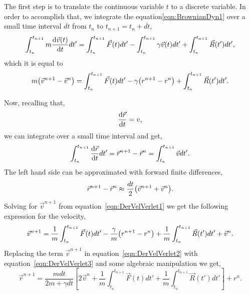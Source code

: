 The first step is to translate the continuous variable $t$ to a discrete variable.
In order to accomplish that, we integrate the equation\eqref{eqn:BrownianDyn1} over a small time interval $dt$ from $t_n$ to $t_{n+1}=t_{n}+dt$,
\begin{align}
    \int_{t_n}^{t_{n+1}}m\dv{\vec{v}(t)}{t}dt'
    =
    \int_{t_n}^{t_{n+1}}\vec{F}(t)dt'
    -\int_{t_n}^{t_{n+1}}\gamma\vec{v}(t)dt'
    +\int_{t_n}^{t_{n+1}}\vec{R}(t')dt',
\end{align}
which it is equal to
\begin{align}
    m\qty(\vec{v}^{n+1} - \vec{v}^{n})
    =
    \int_{t_n}^{t_{n+1}}\vec{F}(t)dt'
    -\gamma\qty(r^{n+1}-r^n)
    +\int_{t_n}^{t_{n+1}}\vec{R}(t')dt'\label{eqn:DerVelVerlet1}.
\end{align}

Now, recalling that,
\begin{gather}
    \dv{\vec{r}}{t} = v,
\end{gather}
we can integrate over a small time interval and get,
\begin{gather}
    \int_{t_n}^{t_{n+1}}\dv{\vec{r}}{t} dt' = \vec{r}^{n+1}-\vec{r}^{n} = \int_{t_n}^{t_{n+1}}\vec{v} dt'.
\end{gather}
The left hand side can be approximated with forward finite differences,
\begin{gather}
    \vec{r}^{n+1}-\vec{r}^{n} \approx \frac{dt}{2}\qty(\vec{v}^{n+1} + \vec{v}^n)\label{eqn:DerVelVerlet2}.
\end{gather}
Solving for $\vec{v}^{n+1}$ from equation~\eqref{eqn:DerVelVerlet1} we get the following expression for the velocity,
\begin{gather}
    \vec{v}^{n+1} = \frac{1}{m}\int_{t_n}^{t_{n+1}}\vec{F}(t)dt'
                     -\frac{\gamma}{m}\qty(r^{n+1}-r^n)
                     +\frac{1}{m}\int_{t_n}^{t_{n+1}}\vec{R}(t')dt'
                     +\vec{v}^{n}\label{eqn:DerVelVerlet3}.
\end{gather}
Replacing the term $\vec{v}^{n+1}$ in equation~\eqref{eqn:DerVelVerlet2} with equation~\eqref{eqn:DerVelVerlet3} and some algebraic manipulation we get,
\begin{equation}
    \vec{r}^{n+1} = \frac{m dt}{2m +\gamma dt}\left[ 
                        2\vec{v}^{n}                
                        +\frac{1}{m}\int_{t_n}^{t_{n+1}}\vec{F}(t)dt'
                        +\frac{1}{m}\int_{t_n}^{t_{n+1}}\vec{R}(t')dt'
                    \right]
                    +r^n\label{eqn:DerVelVerlet4}.
\end{equation}
